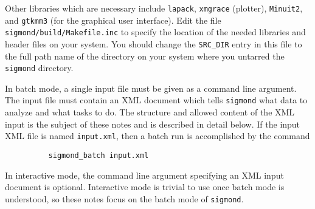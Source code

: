 \documentclass[12pt,notitlepage,letterpaper]{article}
\newcommand{\sigmond}{\texttt{sigmond} }
\newcommand{\vb}{\texttt}
\begin{document}
Other libraries which are necessary include \vb{lapack}, \vb{xmgrace} (plotter), \vb{Minuit2},
and \vb{gtkmm3} (for the graphical user interface).  Edit the file
\vb{sigmond/build/Makefile.inc} to specify the location of the needed
libraries and header files on your system.  You should change the \vb{SRC\_DIR}
entry in this file to the full path name of the directory on your system
where you untarred the \vb{sigmond} directory.

In batch mode, a single input file must be given as a command line
argument.  The input file must contain an XML document which
tells \sigmond what data to analyze and what tasks to do.  The structure
and allowed content of the XML input is the subject of these notes and
is described in detail below.  If the input XML file is named
\vb{input.xml}, then a batch run is accomplished by the command
\begin{verbatim}
          sigmond_batch input.xml
\end{verbatim}

In interactive mode, the command line argument specifying an XML
input document is optional.  Interactive mode is trivial to use
once batch mode is understood, so these notes focus on the batch mode
of \vb{sigmond}.
\end{document}
